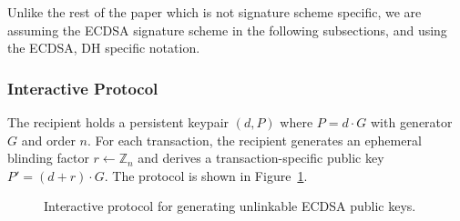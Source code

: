 \documentclass{article}
\begin{document}
Unlike the rest of the paper which is not signature scheme specific, we are assuming the ECDSA signature scheme in the following subsections, and using the ECDSA, DH specific notation.

\subsubsection{Interactive Protocol}

The recipient holds a persistent keypair $(d, P)$ where $P = d \cdot G$ with generator $G$ and order $n$. For each transaction, the recipient generates an ephemeral blinding factor $r \gets \mathbb{Z}_n$ and derives a transaction-specific public key $P' = (d + r) \cdot G$. The protocol is shown in Figure~\ref{fig:protocol1}.


\begin{figure}[!htb]
\centering
{}
\caption{Interactive protocol for generating unlinkable ECDSA public keys.}
\label{fig:protocol1}
\end{figure}
\end{document}
